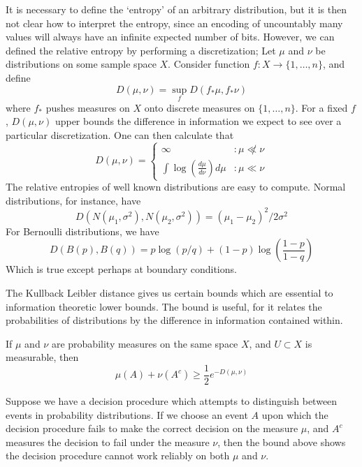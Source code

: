 It is necessary to define the `entropy' of an arbitrary distribution, but it is then not clear how to interpret the entropy, since an encoding of uncountably many values will always have an infinite expected number of bits. However, we can defined the relative entropy by performing a discretization; Let $\mu$ and $\nu$ be distributions on some sample space $X$. Consider function $f: X \to \{ 1, \dots, n \}$, and define
%
\[ D(\mu, \nu) = \sup_f D(f_* \mu, f_* \nu) \]
%
where $f_*$ pushes measures on $X$ onto discrete measures on $\{ 1, \dots, n \}$. For a fixed $f$, $D(\mu, \nu)$ upper bounds the difference in information we expect to see over a particular discretization. One can then calculate that
%
\[ D(\mu, \nu) = \begin{cases} \infty &: \mu \not \ll \nu \\ \int \log(\frac{d\mu}{d\nu}) d\mu &: \mu \ll \nu \end{cases} \]
%
The relative entropies of well known distributions are easy to compute. Normal distributions, for instance, have
%
\[ D(N(\mu_1, \sigma^2), N(\mu_2, \sigma^2)) = (\mu_1 - \mu_2)^2/2\sigma^2 \]
%
For Bernoulli distributions, we have
%
\[ D(B(p), B(q)) = p \log(p/q) + (1-p)\log \left( \frac{1-p}{1-q} \right) \]
%
Which is true except perhaps at boundary conditions.

The Kullback Leibler distance gives us certain bounds which are essential to information theoretic lower bounds. The bound is useful, for it relates the probabilities of distributions by the difference in information contained within.

\begin{theorem}
    If $\mu$ and $\nu$ are probability measures on the same space $X$, and $U \subset X$ is measurable, then
    \[ \mu(A) + \nu(A^c) \geq \frac{1}{2} e^{- D(\mu, \nu)} \]
\end{theorem}

Suppose we have a decision procedure which attempts to distinguish between events in probability distributions. If we choose an event $A$ upon which the decision procedure fails to make the correct decision on the measure $\mu$, and $A^c$ measures the decision to fail under the measure $\nu$, then the bound above shows the decision procedure cannot work reliably on both $\mu$ and $\nu$.
















